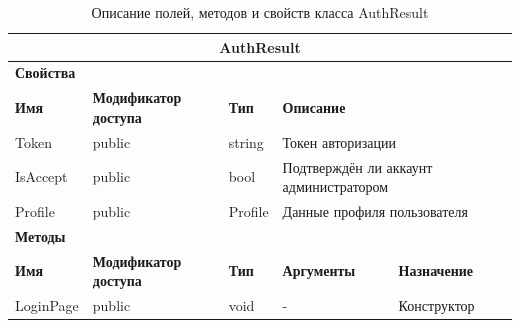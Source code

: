 \documentclass{../includes/TechDoc}
\begin{document}
    \begin{table}[ht]
        \caption{\label{tab:class-authresult-table}Описание полей, методов и свойств класса AuthResult}
        \centering
        \begin{tabular}{|p{3.2cm}|p{3cm}|p{2.9cm}|p{2.9cm}|p{4cm}|}
            \hline
            \multicolumn{5}{|c|}{AuthResult} \\ \hline
            \multicolumn{5}{|l|}{\textbf{Свойства}} \\ \hline
            \textbf{Имя} & \textbf{Модификатор доступа} & \textbf{Тип} & \multicolumn{2}{p{6.9cm}|}{\textbf{Описание}} \\ \hline
            Token & public & string & \multicolumn{2}{p{6.9cm}|}{Токен авторизации} \\ \hline
            IsAccept & public & bool & \multicolumn{2}{p{6.9cm}|}{Подтверждён ли аккаунт администратором} \\ \hline
            Profile & public & Profile & \multicolumn{2}{p{6.9cm}|}{Данные профиля пользователя} \\ \hline
            \multicolumn{5}{|l|}{\textbf{Методы}} \\ \hline
            \textbf{Имя} & \textbf{Модификатор доступа} & \textbf{Тип} & \textbf{Аргументы} & \textbf{Назначение} \\ \hline
            LoginPage & public & void & - & Конструктор \\ \hline
        \end{tabular}
    \end{table}
\end{document}
